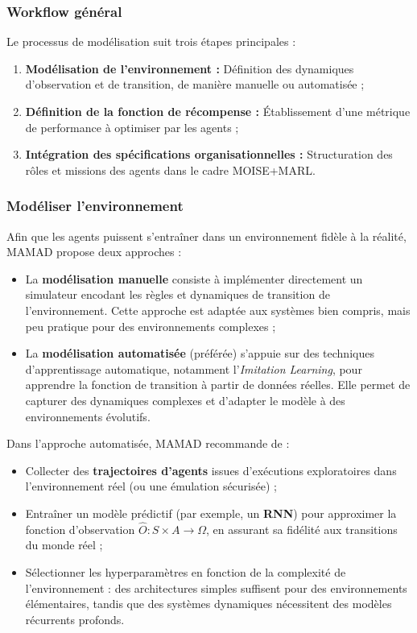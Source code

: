 \documentclass[pdflatex,sn-mathphys-num]{sn-jnl}%
\theoremstyle{thmstyleone}%
\theoremstyle{thmstyletwo}%
\theoremstyle{thmstylethree}%
\begin{document}
\subsubsection{Workflow général}

Le processus de modélisation suit trois étapes principales :
\begin{enumerate}
    \item \textbf{Modélisation de l'environnement :} Définition des dynamiques d'observation et de transition, de manière manuelle ou automatisée ;
    \item \textbf{Définition de la fonction de récompense :} Établissement d'une métrique de performance à optimiser par les agents ;
    \item \textbf{Intégration des spécifications organisationnelles :} Structuration des rôles et missions des agents dans le cadre MOISE+MARL.
\end{enumerate}

\subsubsection{Modéliser l'environnement}

Afin que les agents puissent s'entraîner dans un environnement fidèle à la réalité, MAMAD propose deux approches :
\begin{itemize}
    \item La \textbf{modélisation manuelle} consiste à implémenter directement un simulateur encodant les règles et dynamiques de transition de l'environnement. Cette approche est adaptée aux systèmes bien compris, mais peu pratique pour des environnements complexes ;
          
    \item La \textbf{modélisation automatisée} (préférée) s'appuie sur des techniques d'apprentissage automatique, notamment l'\textit{Imitation Learning}, pour apprendre la fonction de transition à partir de données réelles. Elle permet de capturer des dynamiques complexes et d'adapter le modèle à des environnements évolutifs.
\end{itemize}

Dans l'approche automatisée, MAMAD recommande de :
\begin{itemize}
    \item Collecter des \textbf{trajectoires d'agents} issues d'exécutions exploratoires dans l'environnement réel (ou une émulation sécurisée) ;
    \item Entraîner un modèle prédictif (par exemple, un \textbf{RNN}) pour approximer la fonction d'observation $\hat{O}: S \times A \to \Omega$, en assurant sa fidélité aux transitions du monde réel ;
    \item Sélectionner les hyperparamètres en fonction de la complexité de l'environnement : des architectures simples suffisent pour des environnements élémentaires, tandis que des systèmes dynamiques nécessitent des modèles récurrents profonds.
\end{itemize}
\end{document}
